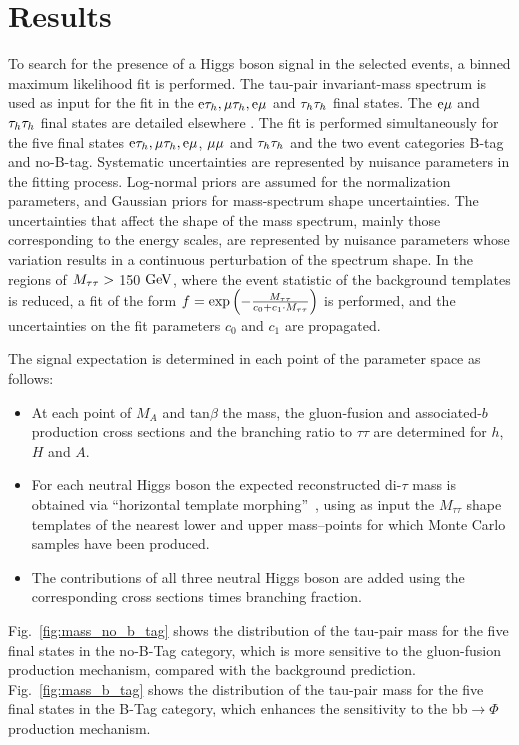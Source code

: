 \section{Results}

To search for the presence of a Higgs boson signal in the selected events, a binned maximum likelihood fit is performed.
The tau-pair invariant-mass spectrum is used as input for the fit in 
the $\mathrm{e}\mathrm{\tau}_{h}, \mathrm{\mu}\mathrm{\tau}_{h}, \mathrm{e}\mathrm{\mu}$ and $\mathrm{\tau}_{h}\mathrm{\tau}_{h}$ 
final states. The $\mathrm{e}\mathrm{\mu}$ and $\mathrm{\tau}_{h}\mathrm{\tau}_{h}$ final states 
are detailed elsewhere \cite{CMS-PAS-HIG-13-021}.
The fit is performed simultaneously for the five final states $\mathrm{e}\mathrm{\tau}_{h}, 
\mathrm{\mu}\mathrm{\tau}_{h}, \mathrm{e}\mathrm{\mu}$, $\mathrm{\mu}\mathrm{\mu}$ and $\mathrm{\tau}_{h}\mathrm{\tau}_{h}$
and the two event categories B-tag and no-B-tag.
Systematic uncertainties are represented by nuisance parameters 
in the fitting process. Log-normal priors are assumed for the 
normalization parameters, and Gaussian priors for mass-spectrum 
shape uncertainties. The uncertainties that affect the shape of the 
mass spectrum, mainly those corresponding to the energy scales, are 
represented by nuisance parameters whose variation results in a 
continuous perturbation of the spectrum shape. 
In the regions of $M_{\mathrm{\tau}\mathrm{\tau}} >$  150 $\mathrm{GeV}$, where the event 
statistic of the background templates is reduced, a fit of the form 
$f=\exp\left(-\frac{M_{\mathrm{\tau}\mathrm{\tau}}}{c_{0}+c_1\cdot M_{\mathrm{\tau}\mathrm{\tau}}}\right)$ 
is performed, and the uncertainties on the fit parameters $c_{0}$ and $c_{1}$ are propagated. 

The signal expectation is determined in each point of the parameter space as follows:
\begin{itemize}
\item At each point of $M_A$ and tan$\beta$ the mass, the gluon-fusion and associated-$b$ production cross sections and the branching ratio to $\tau\tau$ are determined for $h$, $H$ and $A$.
\item For each neutral Higgs boson the expected reconstructed di-$\tau$ mass is obtained via ``horizontal template morphing''~\cite{Read:1999kh},
  using as input the $M_{\tau\tau}$ shape templates of the nearest lower and upper mass--points for which Monte Carlo samples have been produced.
\item The contributions of all three neutral Higgs boson are added using the corresponding cross sections times branching fraction. 
\end{itemize}


Fig.~\ref{fig:mass_no_b_tag} shows the distribution of the tau-pair mass for the five final states in the no-B-Tag category, which is  more sensitive to the gluon-fusion production mechanism, compared with the background prediction. 
Fig.~\ref{fig:mass_b_tag} shows the distribution of the tau-pair mass for the five final states in the B-Tag category, which enhances the sensitivity to the bb$\rightarrow \Phi$ production mechanism. 


